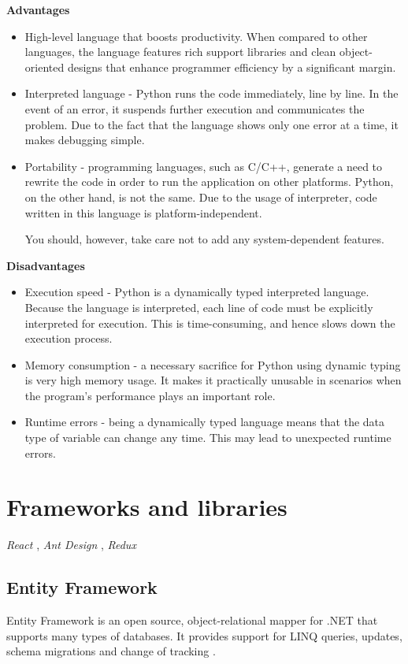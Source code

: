 \textbf{Advantages}
\begin{itemize}
    \item High-level language that boosts productivity. When compared to other languages, the language features rich support libraries and clean object-oriented designs that enhance programmer efficiency by a significant margin.
    \item Interpreted language - Python runs the code immediately, line by line. In the event of an error, it suspends further execution and communicates the problem. Due to the fact that the language shows only one error at a time, it makes debugging simple.
    \item Portability - programming languages, such as C/C++, generate a need to rewrite the code in order to run the application on other platforms. Python, on the other hand, is not the same. Due to the usage of interpreter, code written in this language is platform-independent.

You should, however, take care not to add any system-dependent features.
\end{itemize}

\textbf{Disadvantages}
\begin{itemize}
    \item Execution speed - Python is a dynamically typed interpreted language. Because the language is interpreted, each line of code must be explicitly interpreted for execution. This is time-consuming, and hence slows down the execution process.
    \item Memory consumption - a necessary sacrifice for Python using dynamic typing is very high memory usage. It makes it practically unusable in scenarios when the program's performance plays an important role.
    \item Runtime errors - being a dynamically typed language means that the data type of variable can change any time. This may lead to unexpected runtime errors.
\end{itemize}

\section{Frameworks and libraries}
 \textit{React} \cite{react}, \textit{Ant Design} \cite{ant_design}, \textit{Redux} \cite{redux}

\subsection{Entity Framework}
Entity Framework is an open source, object-relational mapper for .NET that supports many types of databases. It provides support for LINQ queries, updates, schema migrations and change of tracking \cite{ef}\cite{ef-doc}. 

